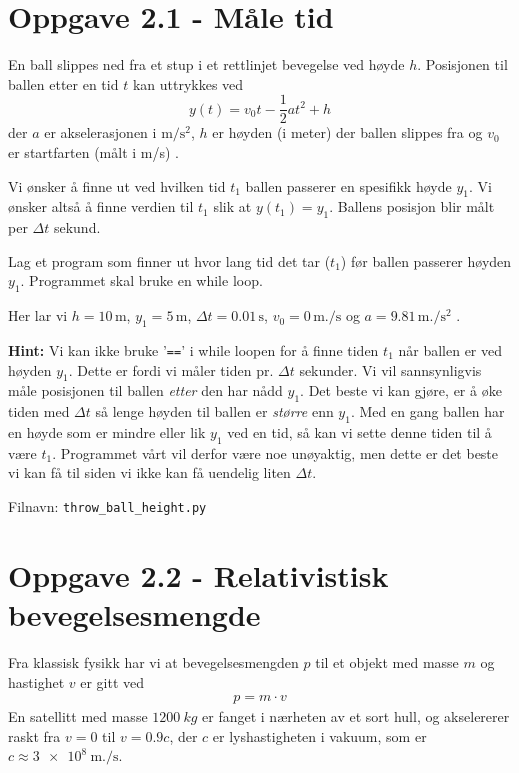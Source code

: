 \documentclass[10pt,a4paper]{article}
\begin{document}
 \tableofcontents
 
	\section*{Oppgave 2.1 - Måle tid}
	En ball slippes ned fra et stup i et rettlinjet bevegelse ved høyde $h$. Posisjonen til ballen etter en tid $t$ kan uttrykkes ved 
	\[
	y(t) = v_0t - \frac{1}{2}at^2 + h
	\]
	der $a$ er akselerasjonen i $\mathrm{m/s^2}$, $h$ er høyden (i meter) der ballen slippes fra og $v_0$ er startfarten (målt i m/s) .
	
	Vi ønsker å finne ut ved hvilken tid $t_1$ ballen passerer en spesifikk høyde $y_1$. Vi ønsker altså å finne verdien til $t_1$ slik at $y(t_1) = y_1$. Ballens posisjon blir målt per $\Delta t$ sekund. 
	
	Lag et program som finner ut hvor lang tid det tar ($t_1$) før ballen passerer høyden $y_1$. Programmet skal bruke en while loop. 
	
	Her lar vi $h = 10\, \si{\meter}$, $y_1 = 5\,\si{\meter}$, $\Delta t = 0.01\,\si{\second}$, $v_0 = 0\,\si{\meter.\per\second}$ og $a = 9.81\,\si{\meter.\per\square\second}$ .  
	
	\textbf{Hint:} Vi kan ikke bruke '\texttt{==}' i while loopen for å finne tiden $t_1$  når ballen er ved høyden $y_1$. Dette er fordi vi måler tiden pr. $\Delta t$ sekunder. Vi vil sannsynligvis måle posisjonen til ballen \textit{etter} den har nådd $y_1$. Det beste vi kan gjøre, er å øke tiden med $\Delta t$ så lenge høyden til ballen er \textit{større} enn $y_1$. Med en gang ballen har en høyde som er mindre eller lik $y_1$ ved en tid, så kan vi sette denne tiden til å være $t_1$. Programmet vårt vil derfor være noe unøyaktig, men dette er det beste vi kan få til siden vi ikke kan få uendelig liten $\Delta t$. 
	
	Filnavn: \texttt{throw\_ball\_height.py}
 
 
\section*{Oppgave 2.2 - Relativistisk bevegelsesmengde}
Fra klassisk fysikk har vi at bevegelsesmengden $p$ til et objekt med masse $m$ og hastighet $v$ er gitt ved
\begin{align*}
p = m\cdot v
\end{align*}
En satellitt med masse $\SI{1200}{kg}$ er fanget i nærheten av et sort hull, og akselererer raskt fra $v = 0$ til $v = 0.9 c$, der $c$ er lyshastigheten i vakuum, som er $c\approx \SI{3e8}{\m.\per \s}$.
 
\end{document}
